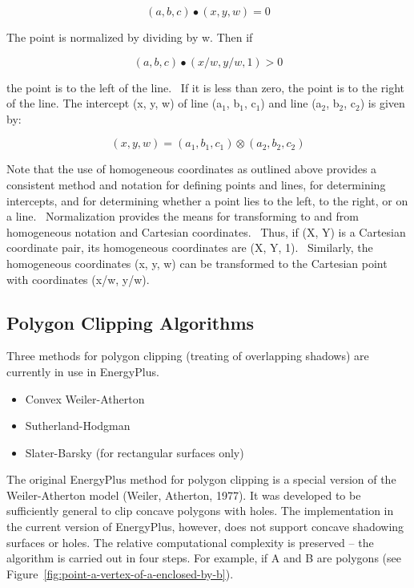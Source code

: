 \begin{equation}
(a,b,c) \bullet (x,y,w) = 0
\end{equation}

The point is normalized by dividing by w. Then if

\begin{equation}
(a,b,c) \bullet (x/w,y/w,1) > 0
\end{equation}

the point is to the left of the line.~ If it is less than zero, the point is to the right of the line. The intercept (x, y, w) of line (a\(_{1}\), b\(_{1}\), c\(_{1}\)) and line (a\(_{2}\), b\(_{2}\), c\(_{2}\)) is given by:

\begin{equation}
(x,y,w) = ({a_1},{b_1},{c_1}) \otimes ({a_2},{b_2},{c_2})
\end{equation}

Note that the use of homogeneous coordinates as outlined above provides a consistent method and notation for defining points and lines, for determining intercepts, and for determining whether a point lies to the left, to the right, or on a line.~ Normalization provides the means for transforming to and from homogeneous notation and Cartesian coordinates.~ Thus, if (X, Y) is a Cartesian coordinate pair, its homogeneous coordinates are (X, Y, 1).~ Similarly, the homogeneous coordinates (x, y, w) can be transformed to the Cartesian point with coordinates (x/w, y/w).

\subsection{Polygon Clipping Algorithms}\label{polygon-clipping-algorithms}

Three methods for polygon clipping (treating of overlapping shadows) are currently in use in EnergyPlus.

\begin{itemize}
\item
  Convex Weiler-Atherton
\item
  Sutherland-Hodgman
\item
  Slater-Barsky (for rectangular surfaces only)
\end{itemize}

The original EnergyPlus method for polygon clipping is a special version of the Weiler-Atherton model (Weiler, Atherton, 1977). It was developed to be sufficiently general to clip concave polygons with holes. The implementation in the current version of EnergyPlus, however, does not support concave shadowing surfaces or holes. The relative computational complexity is preserved -- the algorithm is carried out in four steps. For example, if A and B are polygons (see Figure~\ref{fig:point-a-vertex-of-a-enclosed-by-b}).

